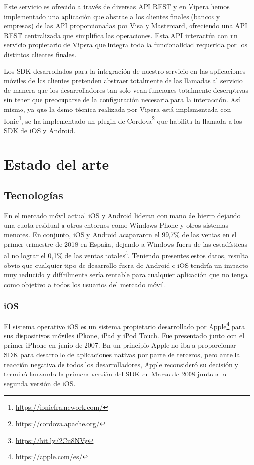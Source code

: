 \documentclass[a4paper, 12pt]{article}
\begin{document}
Este servicio es ofrecido a través de diversas API REST y en Vipera hemos implementado una aplicación que
abstrae a los clientes finales (bancos y empresas) de las API proporcionadas por Visa y Mastercard,
ofreciendo una API REST centralizada que simplifica las operaciones. Esta API interactúa con un servicio
propietario de Vipera que integra toda la funcionalidad requerida por los distintos clientes finales.

Los SDK desarrollados para la integración de nuestro servicio en las aplicaciones móviles de los clientes
pretenden abstraer totalmente de las llamadas al servicio de manera que los desarrolladores tan solo
vean funciones totalmente descriptivas sin tener que preocuparse de la configuración necesaria para la
interacción. Así mismo, ya que la demo técnica realizada por Vipera está implementada con Ionic\footnote{\url{https://ionicframework.com/}},
se ha implementado un plugin de Cordova\footnote{\url{https://cordova.apache.org/}} que habilita la llamada a los SDK de iOS y Android.

\section{Estado del arte}
\label{sec-2}
\subsection{Tecnologías}
\label{sec-2-1}
En el mercado móvil actual iOS y Android lideran con mano de hierro dejando una cuota residual a otros
entornos como Windows Phone y otros sistemas menores. En conjunto, iOS y Android acapararon el 99,7\% de
las ventas en el primer trimestre de 2018 en España, dejando a Windows fuera de las estadísticas al no lograr
el 0,1\% de las ventas totales\footnote{\url{https://bit.ly/2Cu8NVy}}. Teniendo presentes estos datos, resulta obvio que cualquier tipo de desarrollo
fuera de Android e iOS tendría un impacto muy reducido y difícilmente sería rentable para cualquier aplicación
que no tenga como objetivo a todos los usuarios del mercado móvil.
\subsubsection{iOS}
\label{sec-2-1-1}
El sistema operativo iOS es un sistema propietario desarrollado por Apple\footnote{\url{https://apple.com/es/}} para sus dispositivos
móviles iPhone, iPad y iPod Touch. Fue presentado junto con el primer iPhone en junio de 2007. En un
principio Apple no iba a proporcionar SDK para desarrollo de aplicaciones nativas por parte de terceros,
pero ante la reacción negativa de todos los desarrolladores, Apple reconsideró su decisión y terminó
lanzando la primera versión del SDK en Marzo de 2008 junto a la segunda versión de iOS.
\end{document}
